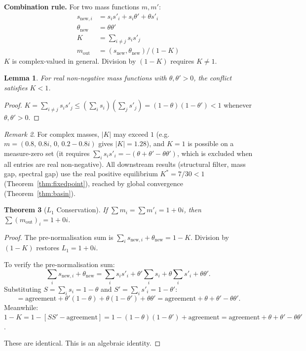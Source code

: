 \documentclass[11pt,a4paper]{article}
\newtheorem{theorem}{Theorem}[section]
\newtheorem{lemma}[theorem]{Lemma}
\theoremstyle{definition}
\theoremstyle{remark}
\newtheorem{remark}[theorem]{Remark}
\begin{document}
\textbf{Combination rule.} For two mass functions $m,m'$:
\begin{align}
s_{\mathrm{new},i}&=s_is'_i+s_i\theta'+\theta s'_i \label{eq:snew}\\
\theta_{\mathrm{new}}&=\theta\theta' \label{eq:thnew}\\
K&=\sum_{i\neq j}s_is'_j \label{eq:K}\\
m_{\mathrm{out}}&=(s_{\mathrm{new}},\theta_{\mathrm{new}})/(1-K) \label{eq:mout}
\end{align}
$K$ is complex-valued in general. Division by $(1-K)$ requires $K\neq 1$.

\begin{lemma}\label{lem:Kbound}
For real non-negative mass functions with $\theta,\theta'>0$, the conflict satisfies $K<1$.
\end{lemma}

\begin{proof}
$K=\sum_{i\neq j}s_is'_j\leq(\sum_i s_i)(\sum_j s'_j)=(1-\theta)(1-\theta')<1$ whenever $\theta,\theta'>0$.
\end{proof}

\begin{remark}\label{rem:Kcomplex}
For complex masses, $|K|$ may exceed $1$ (e.g.\ $m=(0.8,\,0.8i,\,0,\,0.2\!-\!0.8i)$ gives $|K|=1.28$), and $K=1$ is possible on a measure-zero set (it requires $\sum_i s_is'_i=-({\theta+\theta'-\theta\theta'})$, which is excluded when all entries are real non-negative). All downstream results (structural filter, mass gap, spectral gap) use the real positive equilibrium $K^*=7/30<1$ (Theorem~\ref{thm:fixedpoint}), reached by global convergence (Theorem~\ref{thm:basin}).
\end{remark}

\begin{theorem}[$L_1$ Conservation]\label{thm:L1}
If $\sum m_i=\sum m'_i=1+0i$, then $\sum(m_{\mathrm{out}})_i=1+0i$.
\end{theorem}

\begin{proof}
The pre-normalisation sum is $\sum_i s_{\mathrm{new},i}+\theta_{\mathrm{new}}=1-K$. Division by $(1-K)$ restores $L_1=1+0i$.

To verify the pre-normalisation sum:
\[
\sum_i s_{\mathrm{new},i}+\theta_{\mathrm{new}} = \sum_i s_is'_i + \theta'\sum_i s_i + \theta\sum_i s'_i + \theta\theta'.
\]
Substituting $S=\sum_i s_i=1-\theta$ and $S'=\sum_i s'_i=1-\theta'$:
\[
=\text{agreement}+\theta'(1-\theta)+\theta(1-\theta')+\theta\theta' = \text{agreement}+\theta+\theta'-\theta\theta'.
\]
Meanwhile: $1-K=1-[SS'-\text{agreement}]=1-(1-\theta)(1-\theta')+\text{agreement}=\text{agreement}+\theta+\theta'-\theta\theta'$.

These are identical. This is an algebraic identity.
\end{proof}
\end{document}
